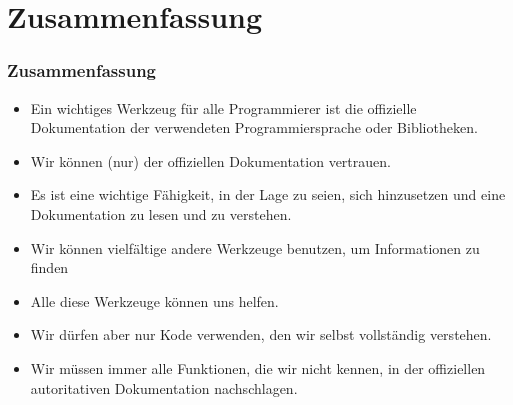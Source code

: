 \documentclass[aspectratio=169,mathserif,notheorems]{beamer}%
\begin{document}
\section{Zusammenfassung}%
%
\begin{frame}%
\frametitle{Zusammenfassung}%
\begin{itemize}%
\item Ein wichtiges Werkzeug für alle Programmierer ist die offizielle Dokumentation der verwendeten Programmiersprache oder Bibliotheken.%
\item<2-> Wir können (nur) der offiziellen Dokumentation vertrauen.%
\item<3-> Es ist eine wichtige Fähigkeit, in der Lage zu seien, sich hinzusetzen und eine Dokumentation zu lesen und zu verstehen.%
\item<4-> Wir können vielfältige andere Werkzeuge benutzen, um Informationen zu finden%
%
\item<8-> Alle diese Werkzeuge können uns helfen.%
\item<9-> Wir dürfen aber nur Kode verwenden, den wir selbst vollständig verstehen.%
\item<10-> Wir müssen immer alle Funktionen, die wir nicht kennen, in der offiziellen autoritativen Dokumentation nachschlagen.%
\end{itemize}%
\end{frame}%
%
\endPresentation%
\end{document}

